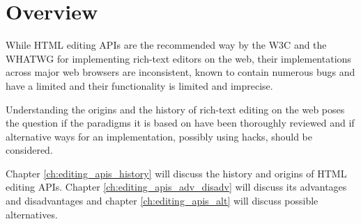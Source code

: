 \chapter{Overview}





While HTML editing APIs are the recommended way by the W3C and the WHATWG for implementing rich-text editors on the web, their implementations across major web browsers are inconsistent, known to contain numerous bugs and have a limited and their functionality is limited and imprecise.

Understanding the origins and the history of rich-text editing on the web poses the question if the paradigms it is based on have been thoroughly reviewed and if alternative ways for an implementation, possibly using hacks, should be considered.




Chapter \ref{ch:editing_apis_history} will discuss the history and origins of HTML editing APIs. Chapter \ref{ch:editing_apis_adv_disadv} will discuss its advantages and disadvantages and
chapter \ref{ch:editing_apis_alt} will discuss possible alternatives.






